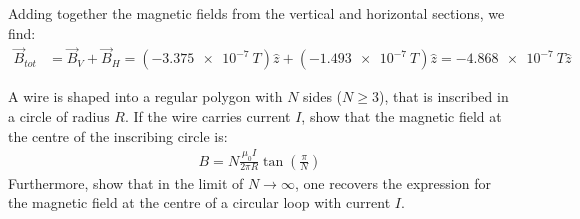 \begin{solution}
Adding together the magnetic fields from the vertical and horizontal sections, we find:
\begin{align*}
\vec B_{tot}&=\vec B_V+\vec B_H=(\SI{-3.375e-7}{T})\hat z+ (\SI{-1.493e-7}{T})\hat z=\SI{-4.868e-7}{T}\hat z
\end{align*}

\end{solution}

\question A wire is shaped into a regular polygon with $N$ sides ($N\geq 3$), that is inscribed in a circle of radius $R$. If the wire carries current $I$, show that the magnetic field at the centre of the inscribing circle is: 
\begin{align*}
B=N\frac{\mu_0I}{2\pi R}\tan\left(\frac{\pi}{N}\right)
\end{align*}
Furthermore, show that in the limit of $N\to\infty$, one recovers the expression for the magnetic field at the centre of a circular loop with current $I$.
